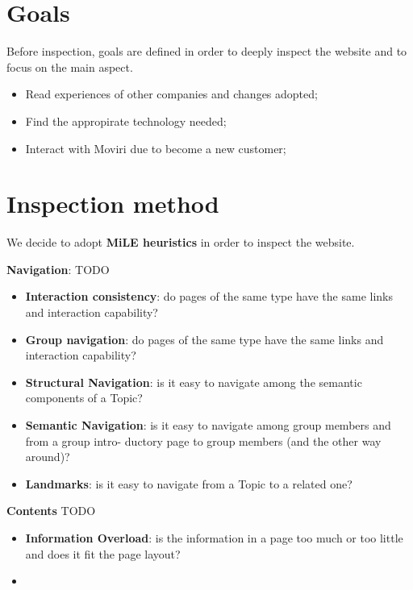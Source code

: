 \section{Goals}
Before inspection, goals are defined in order to deeply inspect the website and to focus on the main aspect. 
\begin{itemize}
\item Read experiences of other companies and changes adopted;
\item Find the appropirate technology needed;
\item Interact with Moviri due to become a new customer;
\end{itemize}
\section{Inspection method}
We decide to adopt \textbf{MiLE heuristics} in order to inspect the website. 

\textbf{Navigation}: TODO
\begin{itemize}
\item \textbf{Interaction consistency}: do pages of the same type have the same links and interaction capability?
\item \textbf{Group navigation}: do pages of the same type have the same links and interaction capability?
\item \textbf{Structural Navigation}: is it easy to navigate among the semantic components of a Topic?
\item \textbf{Semantic Navigation}: is it easy to navigate among group members and from a group intro- ductory page to group members (and the other way around)?
\item \textbf{Landmarks}: is it easy to navigate from a Topic to a related one?
\end{itemize}

\textbf{Contents} TODO 
\begin{itemize}
\item \textbf{Information Overload}: is the information in a page too much or too little and does it fit the page layout?
\item \textbf{}
\end{itemize}

